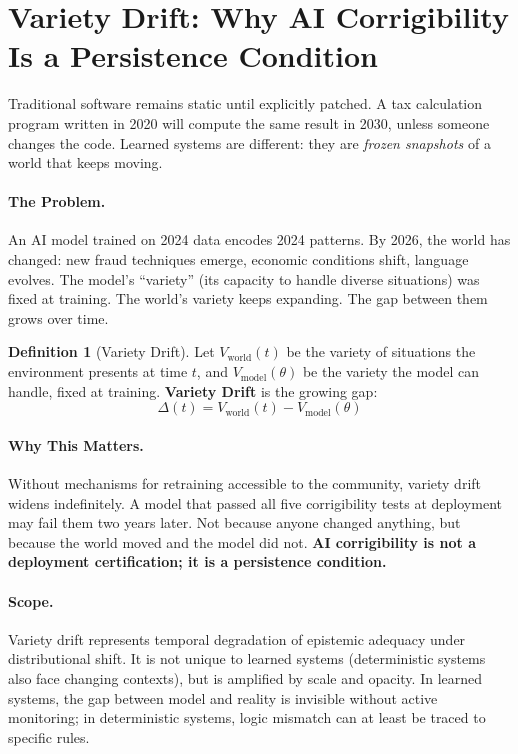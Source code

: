 \documentclass[11pt,a4paper]{article}
\theoremstyle{definition}
\newtheorem{definition}{Definition}[section]
\begin{document}

\section{Variety Drift: Why AI Corrigibility Is a Persistence Condition}
\label{sec:temporal}

Traditional software remains static until explicitly patched. A tax calculation program written in 2020 will compute the same result in 2030, unless someone changes the code. Learned systems are different: they are \textit{frozen snapshots} of a world that keeps moving.

\paragraph{The Problem.} An AI model trained on 2024 data encodes 2024 patterns. By 2026, the world has changed: new fraud techniques emerge, economic conditions shift, language evolves. The model's ``variety'' (its capacity to handle diverse situations) was fixed at training. The world's variety keeps expanding. The gap between them grows over time.

\begin{definition}[Variety Drift]
\label{def:variety-drift}
Let $V_{\text{world}}(t)$ be the variety of situations the environment presents at time $t$, and $V_{\text{model}}(\theta)$ be the variety the model can handle, fixed at training. \textbf{Variety Drift} is the growing gap:
\begin{equation}
\Delta(t) = V_{\text{world}}(t) - V_{\text{model}}(\theta)
\label{eq:variety-gap}
\end{equation}
\end{definition}

\paragraph{Why This Matters.} Without mechanisms for retraining accessible to the community, variety drift widens indefinitely. A model that passed all five corrigibility tests at deployment may fail them two years later. Not because anyone changed anything, but because the world moved and the model did not. \textbf{AI corrigibility is not a deployment certification; it is a persistence condition.}

\paragraph{Scope.} Variety drift represents temporal degradation of epistemic adequacy under distributional shift. It is not unique to learned systems (deterministic systems also face changing contexts), but is amplified by scale and opacity. In learned systems, the gap between model and reality is invisible without active monitoring; in deterministic systems, logic mismatch can at least be traced to specific rules.
\end{document}
